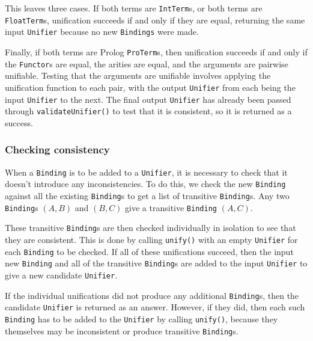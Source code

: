 \documentclass[12pt]{article}
\begin{document}
This leaves three cases. 
If both terms are \verb|IntTerm|s, or both terms are \verb|FloatTerm|s, unification succeeds if and only if they are equal, returning the same input \verb|Unifier| because no new \verb|Bindings| were made. 

Finally, if both terms are Prolog \verb|ProTerm|s, then unification succeeds if and only if the \verb|Functor|s are equal, the arities are equal, and the arguments are pairwise unifiable. 
Testing that the arguments are unifiable involves applying the unification function to each pair, with the output \verb|Unifier| from each being the input \verb|Unifier| to the next. 
The final output \verb|Unifier| has already been passed through \verb|validateUnifier()| to test that it is consistent, so it is returned as a success.

\subsubsection{Checking consistency}


When a \verb|Binding| is to be added to a \verb|Unifier|, it is necessary to check that it doesn't introduce any inconsistencies. 
To do this, we check the new \verb|Binding| against all the existing \verb|Binding|s to get a list of transitive \verb|Binding|s. 
Any two \verb|Binding|s $(A,B)$ and $(B,C)$ give a transitive \verb|Binding| $(A,C)$.

These transitive \verb|Binding|s are then checked individually in isolation to see that they are consistent. 
This is done by calling \verb|unify()| with an empty \verb|Unifier| for each \verb|Binding| to be checked. 
If all of these unifications succeed, then the input new \verb|Binding| and all of the transitive \verb|Binding|s are added to the input \verb|Unifier| to give a new candidate \verb|Unifier|.

If the individual unifications did not produce any additional \verb|Binding|s, then the candidate \verb|Unifier| is returned as an answer. 
However, if they did, then each such \verb|Binding| has to be added to the \verb|Unifier| by calling \verb|unify()|, because they themselves may be inconsistent or produce transitive \verb|Binding|s.
\end{document}
